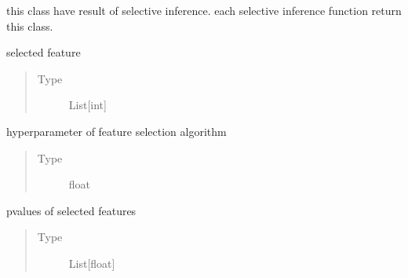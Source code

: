 \documentclass[letterpaper,10pt,english]{sphinxmanual}
\begin{document}
\begin{fulllineitems}
\label{\detokenize{selective:selective_inference.si.SI_result}}
this class have result of selective inference. each selective inference function return this class.

\begin{fulllineitems}
\label{\detokenize{selective:selective_inference.si.SI_result.A}}
selected feature
\begin{quote}\begin{description}
\item[{Type}] \leavevmode
List{[}int{]}

\end{description}\end{quote}

\end{fulllineitems}


\begin{fulllineitems}
\label{\detokenize{selective:selective_inference.si.SI_result.k}}
hyperparameter of feature selection algorithm
\begin{quote}\begin{description}
\item[{Type}] \leavevmode
float

\end{description}\end{quote}

\end{fulllineitems}


\begin{fulllineitems}
\label{\detokenize{selective:selective_inference.si.SI_result.p_values}}
p\sphinxhyphen{}values of selected features
\begin{quote}\begin{description}
\item[{Type}] \leavevmode
List{[}float{]}


\end{description}
\end{quote}
\end{fulllineitems}
\end{fulllineitems}
\end{document}
